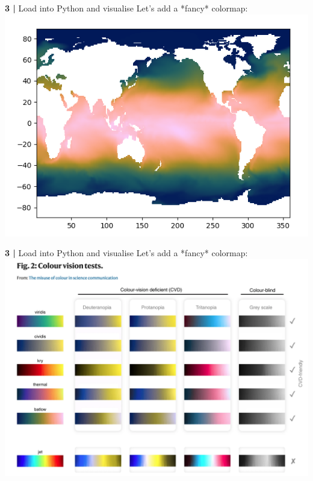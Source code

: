  
\begin{frame}{\textbf{3 |} Load into Python and visualise} 
    Let's add a *fancy* colormap:\\
        \vspace{0.5cm}
    \includegraphics[scale=0.35]{images/Script1_fig3.png}
\end{frame}
 
 
\begin{frame}{\textbf{3 |} Load into Python and visualise} 
    Let's add a *fancy* colormap:\\
        \vspace{0.5cm}
    \includegraphics[scale=0.20]{images/Colormap_1.png}
\end{frame}
 
